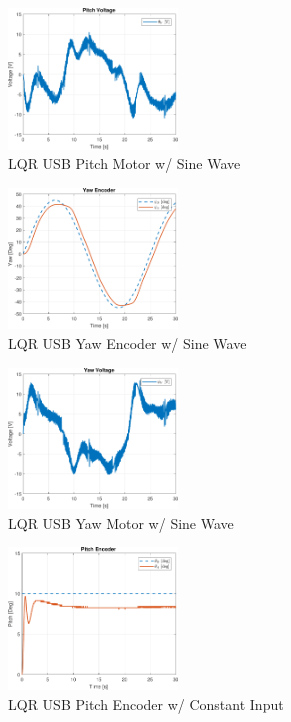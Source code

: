 \documentclass[letterpaper, 10pt, conference]{ieeeconf}
\begin{document}
\begin{figure}
  \centering
  \includegraphics[width=0.4\textwidth]{figs/matlab/LQR/P_USB/Pitch_Volt_LQR_USB_SIN}
  \caption{LQR USB Pitch Motor w/ Sine Wave}
  \label{fig:Pitch_Volt_LQR_USB_SIN}
\end{figure}

\begin{figure}
  \centering
  \includegraphics[width=0.4\textwidth]{figs/matlab/LQR/P_USB/Yaw_Pos_LQR_USB_SIN}
  \caption{LQR USB Yaw Encoder w/ Sine Wave}
  \label{fig:Yaw_Pos_LQR_USB_SIN}
\end{figure}

\begin{figure}
  \centering
  \includegraphics[width=0.4\textwidth]{figs/MATLAB/LQR/P_USB/Yaw_Volt_LQR_USB_SIN}
  \caption{LQR USB Yaw Motor w/ Sine Wave}
  \label{fig:Yaw_Volt_LQR_USB_SIN}
\end{figure}

\begin{figure}
  \centering
  \includegraphics[width=0.4\textwidth]{figs/matlab/LQR/P_USB/Pitch_Pos_LQR_USB_CON}
  \caption{LQR USB Pitch Encoder w/ Constant Input}
  \label{fig:Pitch_Pos_LQR_USB_CON}
\end{figure}
\end{document}
